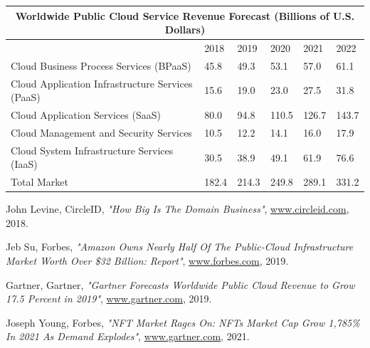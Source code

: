 \documentclass[12pt]{article}
\begin{document}
\vspace{5mm} %
{
\begin{tabular}{ |p{6cm}|p{1cm}|p{1cm}|p{1cm}|p{1cm}|p{1cm}| }
 \hline
 \multicolumn{6}{|c|}{Worldwide Public Cloud Service Revenue Forecast (Billions of U.S. Dollars)} \\
 \hline
  & 2018 &2019 &2020 &2021 &2022\\
 \hline
 Cloud Business Process Services (BPaaS)   
 &45.8
 &49.3
 &53.1
 &57.0
 &61.1\\
  \hline
 Cloud Application Infrastructure Services (PaaS)
 &15.6
 &19.0
 &23.0
 &27.5
 &31.8\\
  \hline
 Cloud Application Services (SaaS) 
 &80.0
 &94.8
 &110.5
 &126.7
 &143.7\\
  \hline
 Cloud Management and Security Services     	
 &10.5
 &12.2
 &14.1
 &16.0
 &17.9\\
  \hline
 Cloud System Infrastructure Services (IaaS)
 &30.5
 &38.9
 &49.1
 &61.9
 &76.6\\
  \hline
 Total Market
 &182.4
 &214.3
 &249.8
 &289.1
 &331.2\\
 \hline
\end{tabular}
\cite{gartner2019}

\newpage
\begin{thebibliography}{999}
    John Levine, CircleID,
    \emph{"How Big Is The Domain Business"},
    \href{https://www.circleid.com/posts/20180813_how_big_is_the_domain_business/}{www.circleid.com},
    2018.

    Jeb Su, Forbes,
    \emph{"Amazon Owns Nearly Half Of The Public-Cloud Infrastructure Market Worth Over \$32 Billion: Report"},
    \href{https://www.forbes.com/sites/jeanbaptiste/2019/08/02/amazon-owns-nearly-half-of-the-public-cloud-infrastructure-market-worth-over-32-billion-report/ }{www.forbes.com},
    2019. 
 
    Gartner, Gartner,
    \emph{"Gartner Forecasts Worldwide Public Cloud Revenue to Grow 17.5 Percent in 2019"},
    \href{https://www.gartner.com/en/newsroom/press-releases/2019-04-02-gartner-forecasts-worldwide-public-cloud-revenue-to-g}{www.gartner.com},
    2019.   

    Joseph Young, Forbes,
    \emph{"NFT Market Rages On: NFTs Market Cap Grow 1,785\% In 2021 As Demand Explodes"},
    \href{https://www.forbes.com/sites/youngjoseph/2021/03/29/nft-market-rages-on-nfts-market-cap-grow-1785-in-2021-as-demand-explodes/
}{www.gartner.com},
    2021.    
  

\end{thebibliography}}
\end{document}
